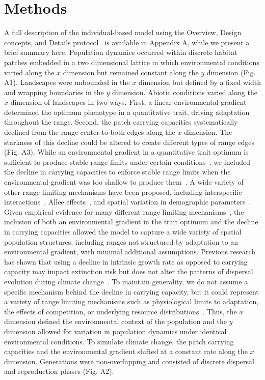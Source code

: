 \documentclass[11pt]{article}
\begin{document}
\section*{Methods}
A full description of the individual-based model using the Overview, Design concepts, and Details protocol~\citep{grimm2010odd} is available in Appendix A, while we present a brief summary here. Population dynamics occurred within discrete habitat patches embedded in a two dimensional lattice in which environmental conditions varied along the $x$ dimension but remained constant along the $y$ dimension (Fig. A1). Landscapes were unbounded in the $x$ dimension but defined by a fixed width and wrapping boundaries in the $y$ dimension. Abiotic conditions varied along the $x$ dimension of landscapes in two ways. First, a linear environmental gradient determined the optimum phenotype in a quantitative trait, driving adaptation throughout the range. Second, the patch carrying capacities systematically declined from the range center to both edges along the $x$ dimension. The starkness of this decline could be altered to create different types of range edges (Fig. A3). While an environmental gradient in a quantitative trait optimum is sufficient to produce stable range limits under certain conditions~\citep{kirkpatrick1997evolution, alleaume2006geographical, polechova2015limits, polechova2018sky}, we included the decline in carrying capacities to enforce stable range limits when the environmental gradient was too shallow to produce them~\citep{alleaume2006geographical, garcia1997genetic}. A wide variety of other range limiting mechanisms have been proposed, including interspecific interactions~\citep{case2000interspecific, price2009evolutionarily}, Allee effects~\citep{keitt2001allee}, and spatial variation in demographic parameters~\citep{holt2005theoretical}. Given empirical evidence for many different range limiting mechanisms~\citep{gaston2009geographic}, the inclusion of both an environmental gradient in the trait optimum and the decline in carrying capacities allowed the model to capture a wide variety of spatial population structures, including ranges not structured by adaptation to an environmental gradient, with minimal additional assumptions. Previous research has shown that using a decline in intrinsic growth rate as opposed to carrying capacity may impact extinction risk but does not alter the patterns of dispersal evolution during climate change~\citep{henry2013eco}. To maintain generality, we do not assume a specific mechanism behind the decline in carrying capacity, but it could represent a variety of range limiting mechanisms such as physiological limits to adaptation, the effects of competition, or underlying resource distributions~\citep{sexton2009evolution, holt2005theoretical, case2000interspecific, price2009evolutionarily}. Thus, the $x$ dimension defined the environmental context of the population and the $y$ dimension allowed for variation in population dynamics under identical environmental conditions. To simulate climate change, the patch carrying capacities and the environmental gradient shifted at a constant rate along the $x$ dimension. Generations were non-overlapping and consisted of discrete dispersal and reproduction phases (Fig. A2). 
\end{document}
